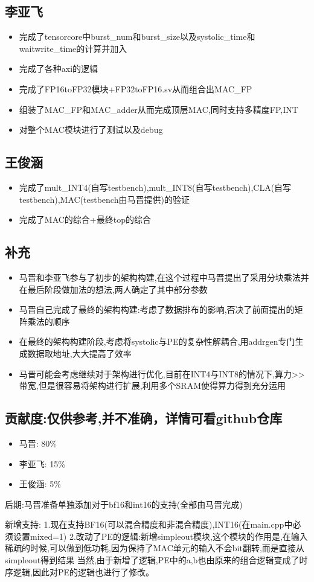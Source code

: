 \documentclass[zihao=-4, UTF8]{ctexart}
\begin{document}
\subsection{李亚飞}
\begin{itemize}
    \item 完成了tensorcore中burst\_num和burst\_size以及systolic\_time和waitwrite\_time的计算并加入
    \item 完成了各种axi的逻辑
    \item 完成了FP16toFP32模块+FP32toFP16.sv从而组合出MAC\_FP
    \item 组装了MAC\_FP和MAC\_adder从而完成顶层MAC,同时支持多精度FP,INT
    \item 对整个MAC模块进行了测试以及debug
\end{itemize}
\subsection{王俊涵}
\begin{itemize}
    \item 完成了mult\_INT4(自写testbench),mult\_INT8(自写testbench),CLA(自写testbench),MAC(testbench由马晋提供)的验证
    \item 完成了MAC的综合+最终top的综合
\end{itemize}
\subsection{补充}
\begin{itemize}
    \item 马晋和李亚飞参与了初步的架构构建,在这个过程中马晋提出了采用分块乘法并在最后阶段做加法的想法,两人确定了其中部分参数
    \item 马晋自己完成了最终的架构构建:考虑了数据排布的影响,否决了前面提出的矩阵乘法的顺序
    \item 在最终的架构构建阶段,考虑将systolic与PE的复杂性解耦合,用addrgen专门生成数据取地址,大大提高了效率
    \item 马晋可能会考虑继续对于架构进行优化,目前在INT4与INT8的情况下,算力>>带宽,但是很容易将架构进行扩展,利用多个SRAM使得算力得到充分运用
\end{itemize}
\subsection{贡献度:仅供参考,并不准确，详情可看github仓库}
\begin{itemize}
    \item 马晋: 80\%
    \item 李亚飞: 15\%
    \item 王俊涵: 5\%
\end{itemize}
后期:马晋准备单独添加对于bf16和int16的支持(全部由马晋完成)


新增支持:
1.现在支持BF16(可以混合精度和非混合精度),INT16(在main.cpp中必须设置mixed=1)
2.改动了PE的逻辑:新增simpleout模块,这个模块的作用是,在输入稀疏的时候,可以做到低功耗,因为保持了MAC单元的输入不会bit翻转,而是直接从simpleout得到结果
当然,由于新增了逻辑,PE中的a,b也由原来的组合逻辑变成了时序逻辑,因此对PE的逻辑也进行了修改。
\end{document}
